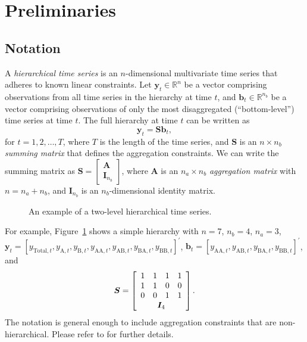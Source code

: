 \documentclass[
  11pt]{article}
\theoremstyle{plain}
\theoremstyle{remark}
\begin{document}
\section{Preliminaries}\label{sec-preliminaries}

\subsection{Notation}\label{notation}

A \emph{hierarchical time series} is an \(n\)-dimensional multivariate
time series that adheres to known linear constraints. Let
\(\bm{y}_t \in \mathbb{R}^n\) be a vector comprising observations from
all time series in the hierarchy at time \(t\), and
\(\bm{b}_t \in \mathbb{R}^{n_b}\) be a vector comprising observations of
only the most disaggregated (``bottom-level'') time series at time
\(t\). The full hierarchy at time \(t\) can be written as \[
\bm{y}_t = \bm{S}\bm{b}_t,
\] for \(t=1,2,\ldots,T\), where \(T\) is the length of the time series,
and \(\bm{S}\) is an \(n \times n_b\) \emph{summing matrix} that defines
the aggregation constraints. We can write the summing matrix as
\(\bm{S} = \left[\begin{array}{c}\bm{A} \\ \bm{I}_{n_b}\end{array}\right]\),
where \(\bm{A}\) is an \(n_a \times n_b\) \emph{aggregation matrix} with
\(n = n_a + n_b\), and \(\bm{I}_{n_b}\) is an \(n_b\)-dimensional
identity matrix.

\begin{figure}[!t]


\caption{\label{fig-hts}An example of a two-level hierarchical time
series.}

\end{figure}%

For example, Figure~\ref{fig-hts} shows a simple hierarchy with
\(n = 7\), \(n_b = 4\), \(n_a = 3\),
\(\bm{y}_t = [y_{\text{Total},t}, y_{\text{A},t}, y_{\text{B},t}, y_{\text{AA},t}, y_{\text{AB},t}, y_{\text{BA},t}, y_{\text{BB},t}]^{\prime}\),
\(\bm{b}_t = [y_{\text{AA},t}, y_{\text{AB},t}, y_{\text{BA},t}, y_{\text{BB},t}]^{\prime}\),
and \[
\bm{S} = \left[
\begin{array}{cccc}
1 & 1 & 1 & 1 \\
1 & 1 & 0 & 0 \\
0 & 0 & 1 & 1 \\
\multicolumn{4}{c}{\bm{I}_4}
\end{array}\right].
\] The notation is general enough to include aggregation constraints
that are non-hierarchical. Please refer to \citet{Hyndman2021-fo} for
further details.
\end{document}
